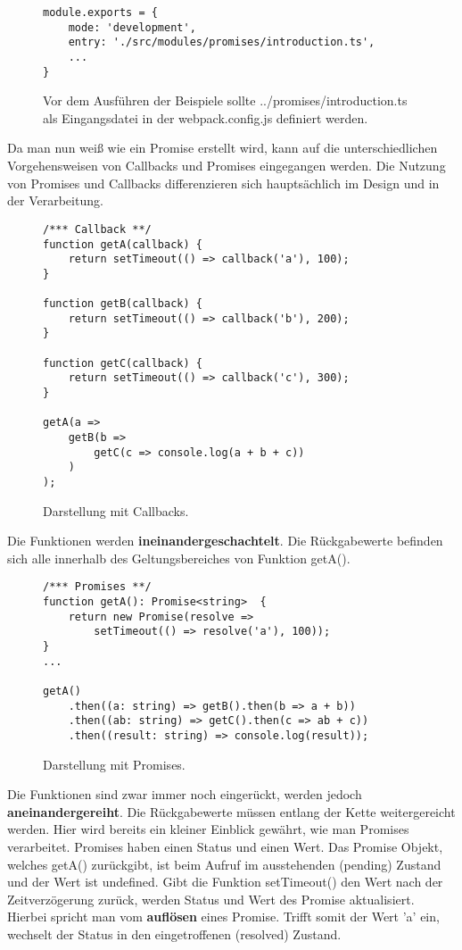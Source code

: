 \begin{figure}[H]
\begin{lstlisting}[basicstyle=\small]
module.exports = {
    mode: 'development',
    entry: './src/modules/promises/introduction.ts',
    ...
}
\end{lstlisting}
\caption{Vor dem Ausführen der Beispiele sollte ../promises/introduction.ts als Eingangsdatei in der webpack.config.js definiert werden.}
\end{figure}

\noindent
Da man nun weiß wie ein Promise erstellt wird, kann auf die unterschiedlichen Vorgehensweisen von Callbacks und Promises eingegangen werden. Die Nutzung von Promises und Callbacks differenzieren sich hauptsächlich im Design und in der Verarbeitung.

\begin{figure}[H]
\begin{lstlisting}[basicstyle=\small]
/*** Callback **/
function getA(callback) {
    return setTimeout(() => callback('a'), 100);
}

function getB(callback) {
    return setTimeout(() => callback('b'), 200);
}

function getC(callback) {
    return setTimeout(() => callback('c'), 300);
}

getA(a =>
    getB(b =>
        getC(c => console.log(a + b + c))
    )
);
\end{lstlisting}
\caption{Darstellung mit Callbacks.}
\end{figure}

\noindent
Die Funktionen werden \textbf{ineinandergeschachtelt}. Die Rückgabewerte befinden sich alle innerhalb des Geltungsbereiches von Funktion getA().

\begin{figure}[H]
\begin{lstlisting}[basicstyle=\small]
/*** Promises **/
function getA(): Promise<string>  {
    return new Promise(resolve =>
        setTimeout(() => resolve('a'), 100));
}
...

getA()
    .then((a: string) => getB().then(b => a + b))
    .then((ab: string) => getC().then(c => ab + c))
    .then((result: string) => console.log(result));
\end{lstlisting}
\caption{Darstellung mit Promises.}
\end{figure}

\noindent
Die Funktionen sind zwar immer noch eingerückt, werden jedoch \textbf{aneinandergereiht}. Die Rückgabewerte müssen entlang der Kette weitergereicht werden. Hier wird bereits ein kleiner Einblick gewährt, wie man Promises verarbeitet. Promises haben einen Status und einen Wert. Das Promise Objekt, welches getA() zurückgibt, ist beim Aufruf im ausstehenden (pending) Zustand und der Wert ist undefined. Gibt die Funktion setTimeout() den Wert nach der Zeitverzögerung zurück, werden Status und Wert des Promise aktualisiert. Hierbei spricht man vom \textbf{auflösen} eines Promise. Trifft somit der Wert 'a' ein, wechselt der Status in den eingetroffenen (resolved) Zustand.

